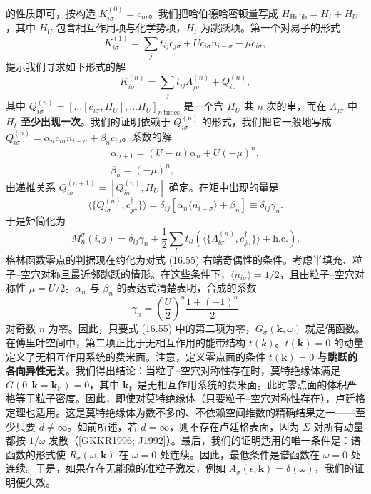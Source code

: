 的性质即可，按构造 $K^{(0)}_{i\sigma}=c_{i\sigma}$。我们把哈伯德哈密顿量写成 $H_{\mathrm{Hubb}}=H_{t}+H_{U}$，其中 $H_{U}$ 包含相互作用项与化学势项，$H_{t}$ 为跳跃项。第一个对易子的形式
\begin{equation*}
K^{(1)}_{i\sigma}=\sum_{j}t_{ij}c_{j\sigma}+Uc_{i\sigma}n_{i-\sigma}-\mu c_{i\sigma},\tag{16.51}
\end{equation*}
提示我们寻求如下形式的解
\begin{equation*}
K^{(n)}_{i\sigma}=\sum_{j}t_{ij}\Lambda^{(n)}_{j\sigma}+Q^{(n)}_{i\sigma},\tag{16.52}
\end{equation*}
其中 $Q^{(n)}_{i\sigma}=[\ldots[c_{i\sigma},H_{U}],\ldots H_{U}]_{n\,\mathrm{times}}$ 是一个含 $H_{U}$ 共 $n$ 次的串，而在 $\Lambda_{j\sigma}$ 中 $H_{t}$ \textbf{至少出现一次}。我们的证明依赖于 $Q^{(n)}_{i\sigma}$ 的形式，我们把它一般地写成 $Q^{(n)}_{i\sigma}=\alpha_{n}c_{i\sigma}n_{i-\sigma}+\beta_{n}c_{i\sigma}$。系数的解
\begin{align*}
\alpha_{n+1}=(U-\mu)\alpha_{n}+U(-\mu)^{n},\\
\beta_{n}=(-\mu)^{n},\tag{16.53}
\end{align*}
由递推关系 $Q^{(n+1)}_{i\sigma}=[Q^{(n)}_{i\sigma},H_{U}]$ 确定。在矩中出现的量是
\begin{equation*}
\langle\{Q^{(n)}_{i\sigma},c^{\dagger}_{j\sigma}\}\rangle=\delta_{ij}[\alpha_{n}\langle n_{i-\sigma}\rangle+\beta_{n}]\equiv\delta_{ij}\gamma_{n}.\tag{16.54}
\end{equation*}
于是矩简化为
\begin{equation*}
M^{\sigma}_{n}(i,j)=\delta_{ij}\gamma_{n}+\frac{1}{2}\sum_{l}t_{il}\left(\langle\{\Lambda^{(n)}_{l\sigma},c^{\dagger}_{j\sigma}\}\rangle+\mathrm{h.c.}\right).\tag{16.55}
\end{equation*}
格林函数零点的判据现在约化为对式 (16.55) 右端奇偶性的条件。考虑半填充、粒子--空穴对称且最近邻跳跃的情形。在这些条件下，$\langle n_{i\sigma}\rangle=1/2$，且由粒子--空穴对称性 $\mu=U/2$。$\alpha_{n}$ 与 $\beta_{n}$ 的表达式清楚表明，合成的系数
\begin{equation*}
\gamma_{n}=\left(\frac{U}{2}\right)^{n}\frac{1+(-1)^{n}}{2}\tag{16.56}
\end{equation*}
对奇数 $n$ 为零。因此，只要式 (16.55) 中的第二项为零，$G_{\sigma}(\mathbf{k},\omega)$ 就是偶函数。在傅里叶空间中，第二项正比于无相互作用的能带结构 $t(k)$。$t(\mathbf{k})=0$ 的动量定义了无相互作用系统的费米面。注意，定义零点面的条件 $t(\mathbf{k})=0$ \textbf{与跳跃的各向异性无关}。我们得出结论：当粒子--空穴对称性存在时，莫特绝缘体满足 $G(0,\mathbf{k}=\mathbf{k}_{\mathrm{F}})=0$，其中 $\mathbf{k}_{\mathrm{F}}$ 是无相互作用系统的费米面。此时零点面的体积严格等于粒子密度。因此，即使对莫特绝缘体（只要粒子--空穴对称性存在），卢廷格定理也适用。这是莫特绝缘体为数不多的、不依赖空间维数的精确结果之一——至少只要 $d\neq\infty$。如前所述，若 $d=\infty$，则不存在卢廷格表面，因为 $\Sigma$ 对所有动量都按 $1/\omega$ 发散（[GKKR1996; J1992]）。最后，我们的证明适用的唯一条件是：谱函数的形式使 $R_{\sigma}(\omega,\mathbf{k})$ 在 $\omega=0$ 处连续。因此，最低条件是谱函数在 $\omega=0$ 处连续。于是，如果存在无能隙的准粒子激发，例如 $A_{\sigma}(\epsilon,\mathbf{k})=\delta(\omega)$，我们的证明便失效。

